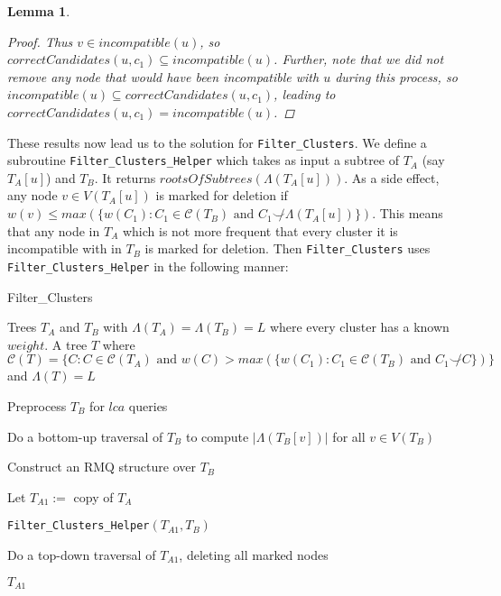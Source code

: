 \documentclass{article}
\newcommand{\compatible}{\smile}
\newcommand{\leafset}{\Lambda}
\newtheorem{incompatibleactualset}[incompatibility]{Lemma}
\begin{document}
\begin{incompatibleactualset}
\begin{proof}
            Thus $v \in incompatible(u)$, so $correctCandidates(u, c_1) \subseteq incompatible(u)$. Further, note that we did not remove any node that would have been incompatible with $u$ during this process, so $incompatible(u) \subseteq correctCandidates(u, c_1)$, leading to $correctCandidates(u, c_1) = incompatible(u)$.
        \end{proof}
    \end{incompatibleactualset}

    These results now lead us to the solution for \texttt{Filter\_Clusters}. We define a subroutine \texttt{Filter\_Clusters\_Helper} which takes as input a subtree of $T_A$ (say $T_A[u]$) and $T_B$. It returns $rootsOfSubtrees(\leafset(T_A[u]))$. As a side effect, any node $v \in V(T_A[u])$ is marked for deletion if $w(v) \leq max(\{w(C_1) : C_1 \in \mathcal{C}(T_B) \text{ and } C_1 \not\compatible \leafset(T_A[u])\})$. This means that any node in $T_A$ which is not more frequent that every cluster it is incompatible with in $T_B$ is marked for deletion. Then \texttt{Filter\_Clusters} uses \texttt{Filter\_Clusters\_Helper} in the following manner:

    \begin{algorithm}
        \caption{Filter\_Clusters}
        \begin{algorithmic}[1]
            \Input Trees $T_A$ and $T_B$ with $\leafset(T_A) = \leafset(T_B) = L$ where every cluster has a known $weight$.
            \Output A tree $T$ where $\mathcal{C}(T) = \{C : C \in \mathcal{C}(T_A) \text{ and } w(C) > max(\{w(C_1) : C_1 \in \mathcal{C}(T_B) \text{ and } C_1 \not\compatible C\})\}$ and $\leafset(T) = L$

            \State Preprocess $T_B$ for $lca$ queries

            \State Do a bottom-up traversal of $T_B$ to compute $|\leafset(T_B[v])|$ for all $v \in V(T_B)$

            \State Construct an RMQ structure over $T_B$

            \State Let $T_{A1} :=$ copy of $T_A$

            \State \texttt{Filter\_Clusters\_Helper}$(T_{A1}, T_B)$

            \State Do a top-down traversal of $T_{A1}$, deleting all marked nodes

            \State \Return $T_{A1}$
        \end{algorithmic}
    \end{algorithm}
\end{document}
